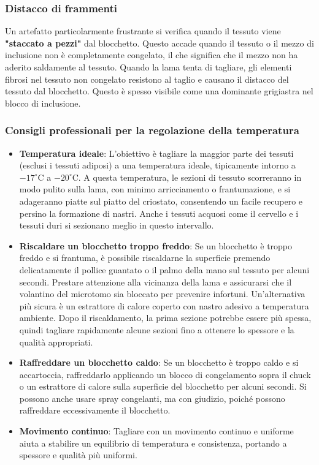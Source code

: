 \subsubsection{Distacco di frammenti}
Un artefatto particolarmente frustrante si verifica quando il tessuto viene \textbf{"staccato a pezzi"} dal blocchetto.  Questo accade quando il tessuto o il mezzo di inclusione non è completamente congelato, il che significa che il mezzo non ha aderito saldamente al tessuto.  Quando la lama tenta di tagliare, gli elementi fibrosi nel tessuto non congelato resistono al taglio e causano il distacco del tessuto dal blocchetto.  Questo è spesso visibile come una dominante grigiastra nel blocco di inclusione. 

\subsubsection{Consigli professionali per la regolazione della temperatura}
\begin{itemize}
    \item   \textbf{Temperatura ideale}: L'obiettivo è tagliare la maggior parte dei tessuti (esclusi i tessuti adiposi) a una temperatura ideale, tipicamente intorno a $-17^\circ \text{C}$ a $-20^\circ \text{C}$.  A questa temperatura, le sezioni di tessuto scorreranno in modo pulito sulla lama, con minimo arricciamento o frantumazione, e si adageranno piatte sul piatto del criostato, consentendo un facile recupero e persino la formazione di nastri.  Anche i tessuti acquosi come il cervello e i tessuti duri si sezionano meglio in questo intervallo. 
    \item   \textbf{Riscaldare un blocchetto troppo freddo}: Se un blocchetto è troppo freddo e si frantuma, è possibile riscaldarne la superficie premendo delicatamente il pollice guantato o il palmo della mano sul tessuto per alcuni secondi.  Prestare attenzione alla vicinanza della lama e assicurarsi che il volantino del microtomo sia bloccato per prevenire infortuni.  Un'alternativa più sicura è un estrattore di calore coperto con nastro adesivo a temperatura ambiente.  Dopo il riscaldamento, la prima sezione potrebbe essere più spessa, quindi tagliare rapidamente alcune sezioni fino a ottenere lo spessore e la qualità appropriati. 
    \item   \textbf{Raffreddare un blocchetto caldo}: Se un blocchetto è troppo caldo e si accartoccia, raffreddarlo applicando un blocco di congelamento sopra il chuck o un estrattore di calore sulla superficie del blocchetto per alcuni secondi.  Si possono anche usare spray congelanti, ma con giudizio, poiché possono raffreddare eccessivamente il blocchetto. 
    \item   \textbf{Movimento continuo}: Tagliare con un movimento continuo e uniforme aiuta a stabilire un equilibrio di temperatura e consistenza, portando a spessore e qualità più uniformi. 
\end{itemize}

